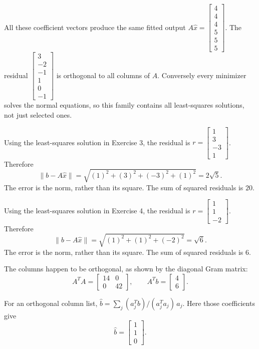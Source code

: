 All these coefficient vectors produce the same fitted output $A\widehat x=\begin{bmatrix}4\\4\\4\\5\\5\\5\end{bmatrix}$. The residual $\begin{bmatrix}3\\-2\\-1\\1\\0\\-1\end{bmatrix}$ is orthogonal to all columns of $A$. Conversely every minimizer solves the normal equations, so this family contains all least-squares solutions, not just selected ones.

Using the least-squares solution in Exercise 3, the residual is $r=\begin{bmatrix}1\\3\\-3\\1\end{bmatrix}$. Therefore
\[ \|b-A\widehat x\|=\sqrt{(1)^2+(3)^2+(-3)^2+(1)^2}=\boxed{2 \sqrt{5}}.\]
The error is the norm, rather than its square. The sum of squared residuals is $20$.

Using the least-squares solution in Exercise 4, the residual is $r=\begin{bmatrix}1\\1\\-2\end{bmatrix}$. Therefore
\[ \|b-A\widehat x\|=\sqrt{(1)^2+(1)^2+(-2)^2}=\boxed{\sqrt{6}}.\]
The error is the norm, rather than its square. The sum of squared residuals is $6$.

The columns happen to be orthogonal, as shown by the diagonal Gram matrix:
\[ A^TA=\begin{bmatrix}14 & 0\\0 & 42\end{bmatrix},\qquad A^Tb=\begin{bmatrix}4\\6\end{bmatrix}.\]

For an orthogonal column list, $\widehat b=\sum_j(a_j^Tb)/(a_j^Ta_j)\,a_j$. Here those coefficients give
\[ \widehat b=\begin{bmatrix}1\\1\\0\end{bmatrix}.\]

